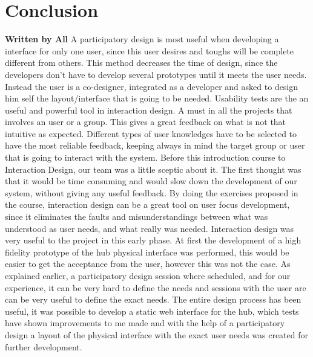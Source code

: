 \chapter{Conclusion}
\textbf{Written by All}\p
A participatory design is most useful when developing a interface for only one user, since this user desires and toughs will be complete different from others. This method decreases the time of design, since the developers don't have to develop several prototypes until it meets the user needs. Instead the user is a co-designer, integrated as a developer and asked to design him self the layout/interface that is going to be needed. \p
Usability tests are the an useful and powerful tool in interaction design. A must in all the projects that involves an user or a group. This gives a great feedback on what is not that intuitive as expected. Different types of user knowledges have to be selected to have the most reliable feedback, keeping always in mind the target group or user that is going to interact with the system.\p
Before this introduction course to Interaction Design, our team was a little sceptic about it. The first thought was that it would be time consuming and would slow down the development of our system, without giving any useful feedback.\p
By doing the exercises proposed in the course, interaction design can be a great tool on user focus development, since it eliminates the faults and misunderstandings between what was understood as user needs, and what really was needed.\p
Interaction design was very useful to the project in this early phase. At first the development of a high fidelity prototype of the hub physical interface was performed, this would be easier to get the acceptance from the user, however this was not the case. As explained earlier, a participatory design session where scheduled, and for our experience, it can be very hard to define the needs and sessions with the user are can be very useful to define the exact needs.\p
The entire design process has been useful, it was possible to develop a static web interface for the hub, which tests have shown improvements to me made and with the help of a participatory design a layout of the physical interface with the exact user needs was created for further development.\p